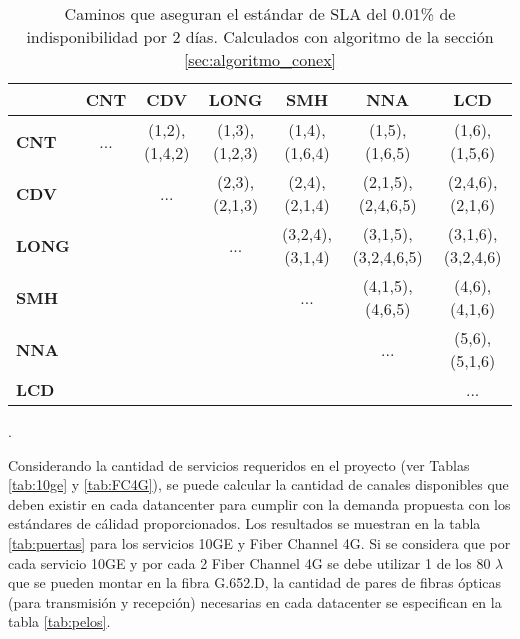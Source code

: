 \begin{table}[!hbt]
\centering
\begin{tabular}{|l | c | c | c | c | c | c|}
\hline
 & \textbf{CNT} & \textbf{CDV} & \textbf{LONG} & \textbf{SMH} & \textbf{NNA} & \textbf{LCD}  \\
\hline
\textbf{CNT} & ... & (1,2),(1,4,2) & (1,3),(1,2,3) & (1,4),(1,6,4) & (1,5),(1,6,5) & (1,6),(1,5,6)\\
\hline
\textbf{CDV} &  & ... & (2,3),(2,1,3) & (2,4),(2,1,4) & (2,1,5),(2,4,6,5) & (2,4,6),(2,1,6)\\
\hline
\textbf{LONG} &  &  & ... & (3,2,4),(3,1,4) & (3,1,5),(3,2,4,6,5) & (3,1,6),(3,2,4,6)\\
\hline
\textbf{SMH} &  &  &  & ... & (4,1,5),(4,6,5) & (4,6),(4,1,6)\\
\hline
\textbf{NNA} & & & & & ... & (5,6),(5,1,6)\\
\hline
\textbf{LCD} & & & & & & ... \\
\hline
\end{tabular}
\caption[Caminos calculados por algoritmo de disponibilidad]{Caminos que aseguran el estándar de SLA del 0.01\% de indisponibilidad por 2 días. Calculados con algoritmo de la sección \ref{sec:algoritmo_conex}}.
\label{tab:caminos}
\end{table}

Considerando la cantidad de servicios requeridos en el proyecto (ver Tablas \ref{tab:10ge} y \ref{tab:FC4G}), se puede calcular la cantidad de canales disponibles que deben existir en cada datancenter para cumplir con la demanda propuesta con los estándares de cálidad proporcionados. Los resultados se muestran en la tabla \ref{tab:puertas} para los servicios 10GE y Fiber Channel 4G. Si se considera que por cada servicio 10GE y por cada 2 Fiber Channel 4G se debe utilizar 1 de los 80 $\lambda$ que se pueden montar en la fibra G.652.D, la cantidad de pares de fibras ópticas (para transmisión y recepción) necesarias en cada datacenter se especifican en la tabla \ref{tab:pelos}.

